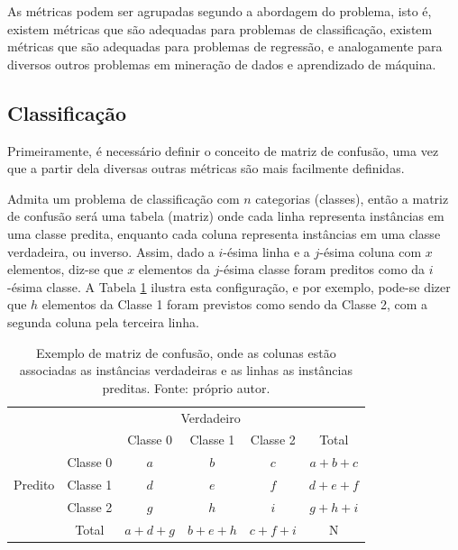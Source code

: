 As métricas podem ser agrupadas segundo a abordagem do problema, isto é, existem métricas que são adequadas para problemas de classificação, existem métricas que são adequadas para problemas de regressão, e analogamente para diversos outros problemas em mineração de dados e aprendizado de máquina.

\subsection{Classificação}

Primeiramente, é necessário definir o conceito de matriz de confusão, uma vez que a partir dela diversas outras métricas são mais facilmente definidas.

Admita um problema de classificação com $n$ categorias (classes), então a matriz de confusão será uma tabela (matriz) onde cada linha representa instâncias em uma classe predita, enquanto cada coluna representa instâncias em uma classe verdadeira, ou inverso. Assim, dado a $i$-ésima linha e a $j$-ésima coluna com $x$ elementos, diz-se que $x$ elementos da $j$-ésima classe foram preditos como da $i$-ésima classe. A Tabela \ref{tab:mc1} ilustra esta configuração, e por exemplo, pode-se dizer que $h$ elementos da Classe 1 foram previstos como sendo da Classe 2, com a segunda coluna pela terceira linha.

\begin{table}[hhh]
\begin{tabular}{l|l|c|c|c|c}
\multicolumn{2}{c}{}&\multicolumn{3}{c}{Verdadeiro}&\\ \cline{3-5}
\multicolumn{2}{c|}{}&Classe 0& Classe 1 & Classe 2&\multicolumn{1}{c}{Total}\\ \cline{2-5}
\multirow{3}{*}{Predito}& Classe 0 & $a$ & $b$ & $c$ & $a+b+c$\\ \cline{2-5}
                        & Classe 1 & $d$ & $e$ & $f$ & $d+e+f$\\ \cline{2-5}
                        & Classe 2 & $g$ & $h$ & $i$ & $g+h+i$\\ \cline{2-5}
\multicolumn{1}{c}{} & \multicolumn{1}{c}{Total} & \multicolumn{1}{c}{$a+d+g$} & \multicolumn{    1}{c}{$b+e+h$} & \multicolumn{1}{c}{$c+f+i$} & \multicolumn{1}{c}{N}\\
\end{tabular}
\caption{Exemplo de matriz de confusão, onde as colunas estão associadas as instâncias verdadeiras e as linhas as instâncias preditas. Fonte: próprio autor.}
\label{tab:mc1}
\end{table}

